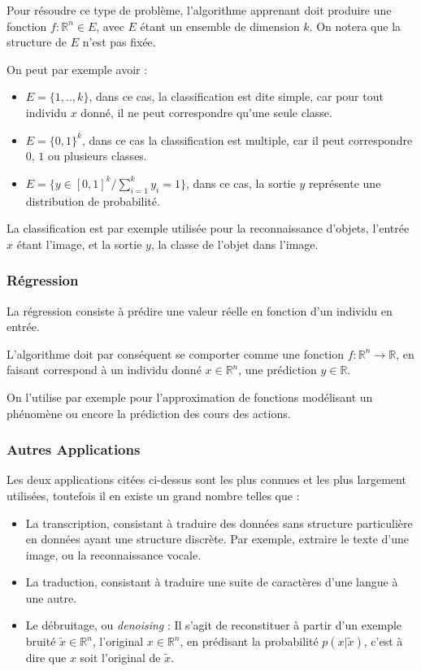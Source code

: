 \documentclass[a4paper, 11pt]{report}
\begin{document}
Pour résoudre ce type de problème, l'algorithme apprenant doit produire une fonction $f : \mathbb{R}^n \in E$, avec $E$ étant un ensemble de dimension $k$.
On notera que la structure de $E$ n'est pas fixée.

On peut par exemple avoir :
\begin{itemize}
	\item $E = \{1,..,k\}$, dans ce cas, la classification est dite simple, car pour tout individu $x$ donné, il ne peut correspondre qu'une seule classe.
	\item $E = \{0,1\}^k$, dans ce cas la classification est multiple, car il peut correspondre $0$, $1$ ou plusieurs classes.
	\item $E = \{y \in [0,1]^k/ \sum_{i=1}^{k}{y_i}=1  \}$, dans ce cas, la sortie $y$ représente une distribution de probabilité.
\end{itemize}
La classification est par exemple utilisée pour la reconnaissance d'objets, l'entrée $x$ étant l'image, et la sortie $y$, la classe de l'objet dans l'image.
\subsubsection{Régression}
La régression consiste à prédire une valeur réelle en fonction d'un individu en entrée.

L'algorithme doit par conséquent se comporter comme une fonction $f : \mathbb{R}^n \rightarrow \mathbb{R}$, en faisant correspond à un individu donné $x \in \mathbb{R}^n$, une prédiction $y \in \mathbb{R}$.

On l'utilise par exemple pour l'approximation de fonctions modélisant un phénomène ou encore la prédiction des cours des actions.
\subsubsection{Autres Applications}
Les deux applications citées ci-dessus sont les plus connues et les plus largement utilisées, toutefois il en existe un grand nombre telles que :
\begin{itemize}
	\item La transcription, consistant à traduire des données sans structure particulière en données ayant une structure discrète. Par exemple, extraire le texte d'une image, ou la reconnaissance vocale.
	\item La traduction, consistant à traduire une suite de caractères d'une langue à une autre.
	\item Le débruitage, ou \emph{denoising} : Il s'agit de reconstituer à partir d'un exemple bruité $\tilde{x} \in \mathbb{R}^n$, l'original $x \in \mathbb{R}^n$, en prédisant la probabilité $p(x|\tilde{x})$, c'est à dire que $x$ soit l'original de $\tilde{x}$.
\end{itemize}
		
\end{document}
